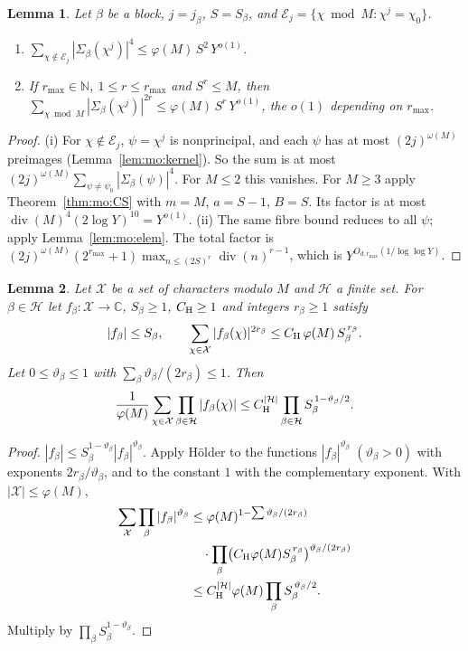 \documentclass{amsart}
\newtheorem{lemma}{Lemma}[section]
\theoremstyle{definition}
\theoremstyle{plain}
\numberwithin{equation}{section}
\numberwithin{table}{section}
\newcommand{\N}{\mathbb{N}}
\begin{document}
\begin{lemma}\label{lem:mo:power}
Let $\beta$ be a block, $j=j_\beta$, $S=S_\beta$, and
$\mathcal E_j=\{\chi\bmod M:\chi^j=\chi_0\}$.
\begin{enumerate}
\item[(i)] $\displaystyle\sum_{\chi\notin\mathcal E_j}|\Sigma_\beta(\chi^j)|^4
 \le\varphi(M)\,S^2\,Y^{o(1)}$.
\item[(ii)] If $r_{\max}\in\N$, $1\le r\le r_{\max}$ and $S^r\le M$, then
 $\displaystyle\sum_{\chi\bmod M}|\Sigma_\beta(\chi^j)|^{2r}\le\varphi(M)\,S^r\,Y^{o(1)}$,
 the $o(1)$ depending on $r_{\max}$.
\end{enumerate}
\end{lemma}

\begin{proof}
(i) For $\chi\notin\mathcal E_j$, $\psi=\chi^j$ is nonprincipal, and each
$\psi$ has at most $(2j)^{\omega(M)}$ preimages
(Lemma~\ref{lem:mo:kernel}). So the sum is at most
$(2j)^{\omega(M)}\sum_{\psi\ne\psi_0}|\Sigma_\beta(\psi)|^4$. For $M\le2$ this
vanishes. For $M\ge3$ apply Theorem~\ref{thm:mo:CS} with $m=M$, $a=S-1$, $B=S$.
Its factor is at most $\operatorname{div}(M)^4(2\log Y)^{10}=Y^{o(1)}$.
(ii) The same fibre bound reduces to all $\psi$; apply
Lemma~\ref{lem:mo:elem}. The total factor is
$(2j)^{\omega(M)}(2^{r_{\max}}+1)\max_{n\le(2S)^r}\operatorname{div}(n)^{r-1}$,
which is $Y^{O_{d,r_{\max}}(1/\log\log Y)}$.
\end{proof}

\begin{lemma}\label{lem:mo:holder}
Let $\mathcal X$ be a set of characters modulo $M$ and $\mathcal H$ a finite
set. For $\beta\in\mathcal H$ let $f_\beta:\mathcal X\to\mathbb C$,
$S_\beta\ge1$, $C_{\rm H}\ge1$ and integers $r_\beta\ge1$ satisfy
\[
 |f_\beta|\le S_\beta,\qquad
 \sum_{\chi\in\mathcal X}|f_\beta(\chi)|^{2r_\beta}\le C_{\rm H}\,\varphi(M)\,S_\beta^{\,r_\beta}.
\]
Let $0\le\vartheta_\beta\le1$ with $\sum_\beta\vartheta_\beta/(2r_\beta)\le1$. Then
\[
 \frac1{\varphi(M)}\sum_{\chi\in\mathcal X}\prod_{\beta\in\mathcal H}|f_\beta(\chi)|
 \le C_{\rm H}^{|\mathcal H|}\prod_{\beta\in\mathcal H}S_\beta^{\,1-\vartheta_\beta/2}.
\]
\end{lemma}

\begin{proof}
$|f_\beta|\le S_\beta^{1-\vartheta_\beta}|f_\beta|^{\vartheta_\beta}$. Apply Hölder to
the functions $|f_\beta|^{\vartheta_\beta}$ $(\vartheta_\beta>0)$ with exponents
$2r_\beta/\vartheta_\beta$, and to the constant $1$ with the complementary
exponent. With $|\mathcal X|\le\varphi(M)$,
\[
 \begin{aligned}
 \sum_{\mathcal X}\prod_\beta|f_\beta|^{\vartheta_\beta}
 &\le\varphi(M)^{1-\sum\vartheta_\beta/(2r_\beta)}\\
 &\quad\cdot\prod_\beta\bigl(C_{\rm H}\varphi(M)S_\beta^{\,r_\beta}\bigr)^{\vartheta_\beta/(2r_\beta)}\\
 &\le C_{\rm H}^{|\mathcal H|}\varphi(M)\prod_\beta S_\beta^{\,\vartheta_\beta/2}.
 \end{aligned}
\]
Multiply by $\prod_\beta S_\beta^{1-\vartheta_\beta}$.
\end{proof}
\end{document}

